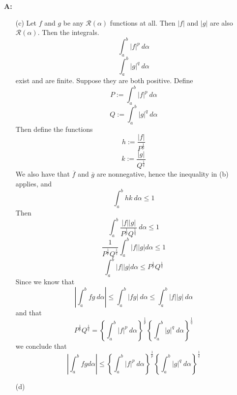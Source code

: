 \documentclass{article}
\newenvironment{Answer} {\par\noindent\textbf{A:}} {}
\begin{document}
\begin{Answer}
\begin{itemize}
    \item[(c)]
        Let $f$ and $g$ be any $\mathscr{R}(\alpha)$ functions at all. Then $|f|$ and $|g|$ are also $\mathscr{R}(\alpha)$. Then the integrals.
        \[\int_a^b |f|^p \: d\alpha\]
        \[\int_a^b |g|^q \: d\alpha\]
        exist and are finite.  Suppose they are both positive. Define 
        \[P := \int_a^b |f|^p \: d\alpha\]
        \[Q := \int_a^b |g|^q \: d\alpha\]
        Then define the functions
        \[h := \frac{|f|}{P^{\frac{1}{p}}}\]
        \[k := \frac{|g|}{Q^{\frac{1}{q}}}\]
        We also have that $\overline{f}$ and $\overline{g}$ are nonnegative, hence the inequality in (b) applies, and
        \[\int_a^b hk \: d\alpha \leq 1\]
        Then
        \[\int_a^b \frac{|f||g|}{P^{\frac{1}{p}}Q^{\frac{1}{q}}} \: d\alpha \leq 1\]
        \[\frac{1}{P^{\frac{1}{p}}Q^{\frac{1}{q}}}\int_a^b |f||g| d\alpha \leq 1\]
        \[\int_a^b |f||g| d\alpha \leq P^{\frac{1}{p}}Q^{\frac{1}{q}} \]
        Since we know that
        \[\left|\int_a^b fg \: d\alpha \right| \leq \int_a^b |fg| \: d\alpha \leq \int_a^b |f||g| \: d\alpha\]
        and that
        \[P^{\frac{1}{p}}Q^{\frac{1}{q}} = \left\{\int_a^b |f|^p \: d\alpha \right\}^{\frac{1}{p}}\left\{\int_a^b |g|^q \: d\alpha\right\}^{\frac{1}{q}}\]
        we conclude that
        \[\left|\int_a^b fg d\alpha\right| \leq \left\{\int_a^b |f|^p \: d\alpha \right\}^{\frac{1}{p}}\left\{\int_a^b |g|^q \: d\alpha\right\}^{\frac{1}{q}} \]

    \item[(d)]

        
    \end{itemize}
\end{Answer}
\end{document}
